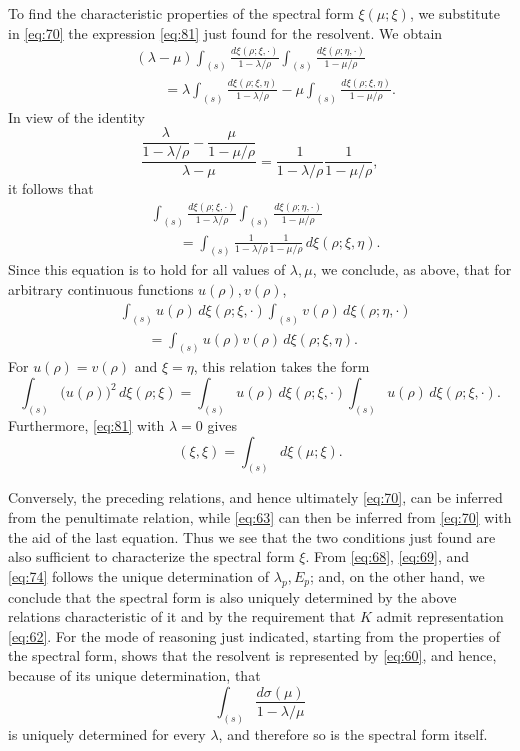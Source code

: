 \documentclass[b5paper,twoside]{article}
\newcommand{\originalpage}[1]{\phantomsection\label{origpage:#1}}
\begin{document}
To find the characteristic properties of the spectral form $\xi(\mu;\xi)$,
we substitute in \eqref{eq:70} \originalpage{197}the expression
\eqref{eq:81} just found for the resolvent. We obtain
\[
\begin{aligned}
  &(\lambda-\mu)
  \int_{(s)}\frac{d\xi(\rho;\xi,\mathord{\cdot})}{1-\lambda/\rho}
  \int_{(s)}\frac{d\xi(\rho;\eta,\mathord{\cdot})}{1-\mu/\rho}\\
  &\qquad
  =\lambda\int_{(s)}\frac{d\xi(\rho;\xi,\eta)}{1-\lambda/\rho}
   -\mu\int_{(s)}\frac{d\xi(\rho;\xi,\eta)}{1-\mu/\rho}.
\end{aligned}
\]
In view of the identity
\[
  \frac{
    \dfrac{\lambda}{1-\lambda/\rho}
    -\dfrac{\mu}{1-\mu/\rho}
  }{\lambda-\mu}
  =\frac{1}{1-\lambda/\rho}\frac{1}{1-\mu/\rho},
\]
it follows that
\[
\begin{aligned}
  &\int_{(s)}\frac{d\xi(\rho;\xi,\mathord{\cdot})}{1-\lambda/\rho}
   \int_{(s)}\frac{d\xi(\rho;\eta,\mathord{\cdot})}{1-\mu/\rho}\\
  &\qquad
   =\int_{(s)}
    \frac{1}{1-\lambda/\rho}\frac{1}{1-\mu/\rho}
    \,d\xi(\rho;\xi,\eta).
\end{aligned}
\]
Since this equation is to hold for all values of $\lambda,\mu$, we conclude,
as above, that for arbitrary continuous functions $u(\rho),v(\rho)$,
\[
\begin{aligned}
  &\int_{(s)}u(\rho)\,d\xi(\rho;\xi,\mathord{\cdot})
   \int_{(s)}v(\rho)\,d\xi(\rho;\eta,\mathord{\cdot})\\
  &\qquad
   =\int_{(s)}u(\rho)v(\rho)\,d\xi(\rho;\xi,\eta).
\end{aligned}
\]
For $u(\rho)=v(\rho)$ and $\xi=\eta$, this relation takes the form
\[
  \int_{(s)}\bigl(u(\rho)\bigr)^2\,d\xi(\rho;\xi)
  =\int_{(s)}u(\rho)\,d\xi(\rho;\xi,\mathord{\cdot})
   \int_{(s)}u(\rho)\,d\xi(\rho;\xi,\mathord{\cdot}).
\]
Furthermore, \eqref{eq:81} with $\lambda=0$ gives
\[
  (\xi,\xi)=\int_{(s)}d\xi(\mu;\xi).
\]

Conversely, the preceding relations, and hence ultimately \eqref{eq:70}, can
be inferred from the penultimate relation, while \eqref{eq:63} can then be
inferred from \eqref{eq:70} with the aid of the last equation.  Thus we see
that the two conditions just found are also sufficient to characterize the
spectral form $\xi$.  From \eqref{eq:68}, \eqref{eq:69}, and \eqref{eq:74}
follows the unique determination of $\lambda_p,E_p$; and, on the other hand,
we conclude that the spectral form is also uniquely determined by the above
relations characteristic of it and by the requirement that $K$ admit
representation \eqref{eq:62}.  For the mode of reasoning just indicated,
starting from the properties of the spectral form,
\originalpage{198}shows that the resolvent is represented by \eqref{eq:60},
and hence, because of its unique determination, that
\[
  \int_{(s)}\frac{d\sigma(\mu)}{1-\lambda/\mu}
\]
is uniquely determined for every $\lambda$, and therefore so is the spectral
form itself.
\end{document}
